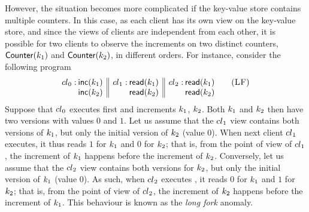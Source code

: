 However, the situation becomes more complicated if the key-value store contains multiple counters. 
In this case, as each client has its own view on the key-value store, and since the views 
of clients are independent from each other, it is possible for two 
clients to observe the increments on two distinct counters, $\mathsf{Counter}(k_1)$ and $\mathsf{Counter}(k_2)$, in different orders. 
For instance, consider the following program
\begin{align}
	\begin{array}[t]{@{} r @{\hspace{2pt}} l || r @{\hspace{2pt}} l || r @{\hspace{2pt}} l @{}}
		\cl_0: 
		& \ctrinc(\ke_1) 
		& \cl_1: 
		& \ctrread(\ke_1)
		& \cl_2: 
		& \ctrread(\ke_1)\\
%
		& \ctrinc(\ke_2) 
		&& \ctrread(\ke_2)
		&& \ctrread(\ke_2)
	\end{array}
	\tag{\textsc{LF}}
	\label{prog:LF}
\end{align}
Suppose that ${cl}_0$ executes first and increments $k_1$, $k_2$. 
Both $k_1$ and $k_2$ then have two versions with values $0$ and $1$. 
Let us assume that the ${cl}_1$ view contains both versions of $k_1$, but only 
the initial version of $k_2$ (value $0$). 
When next client ${cl}_1$ executes, it thus reads $1$ for $k_1$ and $0$ for $k_2$; 
that is, from the point of view of ${cl}_1$, the increment of $k_1$ 
happens before the increment of $k_2$. 
Conversely, let us assume that the ${cl}_2$ view contains both versions for $k_2$, but only 
the initial version of $k_1$ (value $0$). 
As such, when ${cl}_2$ executes , it reads $0$ for $k_1$ and $1$ for $k_2$;
that is, from the point of view of ${cl}_2$, the increment of $k_2$ 
happens before the increment of $k_1$. 
This behaviour is known as the \emph{long fork} anomaly. 

